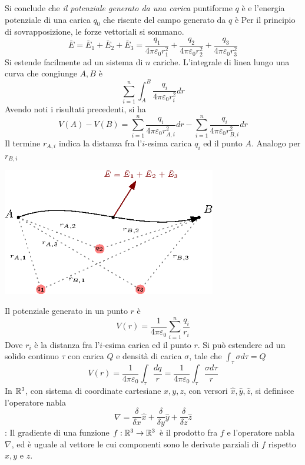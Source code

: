 \documentclass[10pt, letterpaper]{report}
\begin{document}
Si conclude che \textit{il potenziale generato da una carica} puntiforme $q$ è 
e l'energia potenziale di una carica $q_0$ che risente del campo generato da $q$ è 
Per il principio di sovrapposizione, le forze vettoriali si sommano. 
$$ \bar E = \bar E_1+\bar E_2 +\bar E_3 =\frac{q_1}{4\pi\varepsilon_0r_1^2}+ 
\frac{q_2}{4\pi\varepsilon_0r_2^2} + 
\frac{q_3}{4\pi\varepsilon_0r_3^2}$$
Si estende facilmente ad un sistema di $n$ cariche. L'integrale di linea lungo una curva che congiunge $A,B$ è 
$$\sum_{i=1}^n\int_A^B  \frac{q_i}{4\pi\varepsilon_0r_i^2}dr$$ 
Avendo noti i risultati precedenti, si ha  
$$ V(A)-V(B)=\sum_{i=1}^n \frac{q_i}{4\pi\varepsilon_0r_{A,i}^2}dr-\sum_{i=1}^n \frac{q_i}{4\pi\varepsilon_0r_{B,i}^2}dr$$
Il termine $r_{A,i}$ indica la distanza fra l'$i$-esima carica $q_i$ ed il punto $A$. Analogo per $r_{B,i}$
\begin{center}
    \includegraphics[width=0.7\textwidth]{images/sistemaCariche.eps}
\end{center}
Il potenziale generato in un punto $r$ è 
$$ V(r)=\frac{1}{4\pi\varepsilon_0}\sum_{i=1}^n\frac{q_i}{r_i}$$
Dove $r_i$ è la distanza fra l'$i$-esima carica ed il punto $r$. Si può estendere ad un solido continuo $\tau$ con carica $Q$ e  densità di carica $\sigma$, tale che $\int_{\tau}\sigma d\tau=Q$
$$ V(r)=\frac{1}{4\pi\varepsilon_0}\int_{\tau}\frac{dq}{r}=\frac{1}{4\pi\varepsilon_0}\int_{\tau}\frac{\sigma d\tau}{r}$$
 In ${\mathbb R}^3$, con sistema di coordinate cartesiane $x,y,z$, con versori  $\hat x,\hat y,\hat z$, si definisce l'operatore nabla 
$$ \nabla = \dfrac{\delta}{\delta x}\hat x+\dfrac{\delta}{\delta y}\hat y+\dfrac{\delta}{\delta z}\hat z$$
 : Il gradiente di una funzione $f:{\mathbb R}^3\rightarrow {\mathbb R}^3$ è il prodotto fra $f$ e l'operatore nabla $\nabla$, ed è uguale al vettore le cui componenti sono le derivate parziali di $f$ rispetto $x,y$ e $z$. 
\end{document}
